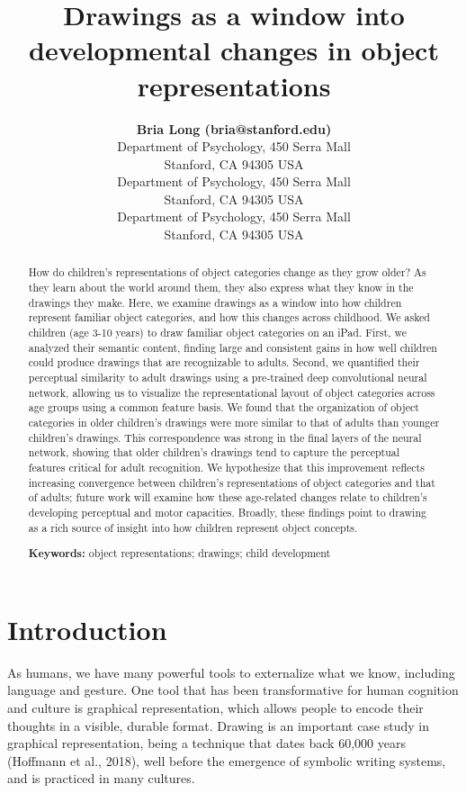\documentclass[10pt, letterpaper]{article}
\title{Drawings as a window into developmental changes in object
representations}
\author{{\large \bf Bria Long (bria@stanford.edu)} \\
  Department of Psychology, 450 Serra Mall \\
  Stanford, CA 94305 USA
  \AND {\large \bf Judith E. Fan (jefan@stanford.edu)} \\
  Department of Psychology, 450 Serra Mall \\
  Stanford, CA 94305 USA
  \AND {\large \bf Michael C. Frank (mcfrank@stanford.edu)} \\
  Department of Psychology, 450 Serra Mall \\
  Stanford, CA 94305 USA}
\begin{document}
\maketitle

\begin{abstract}
How do children's representations of object categories change as they
grow older? As they learn about the world around them, they also express
what they know in the drawings they make. Here, we examine drawings as a
window into how children represent familiar object categories, and how
this changes across childhood. We asked children (age 3-10 years) to
draw familiar object categories on an iPad. First, we analyzed their
semantic content, finding large and consistent gains in how well
children could produce drawings that are recognizable to adults. Second,
we quantified their perceptual similarity to adult drawings using a
pre-trained deep convolutional neural network, allowing us to visualize
the representational layout of object categories across age groups using
a common feature basis. We found that the organization of object
categories in older children's drawings were more similar to that of
adults than younger children's drawings. This correspondence was strong
in the final layers of the neural network, showing that older children's
drawings tend to capture the perceptual features critical for adult
recognition. We hypothesize that this improvement reflects increasing
convergence between children's representations of object categories and
that of adults; future work will examine how these age-related changes
relate to children's developing perceptual and motor capacities.
Broadly, these findings point to drawing as a rich source of insight
into how children represent object concepts.

\textbf{Keywords:}
object representations; drawings; child development
\end{abstract}

\newcommand{\wrapmf}[1]{#1} 





\section{Introduction}\label{introduction}

As humans, we have many powerful tools to externalize what we know,
including language and gesture. One tool that has been transformative
for human cognition and culture is graphical representation, which
allows people to encode their thoughts in a visible, durable format.
Drawing is an important case study in graphical representation, being a
technique that dates back 60,000 years (Hoffmann et al., 2018), well
before the emergence of symbolic writing systems, and is practiced in
many cultures.
\end{document}
